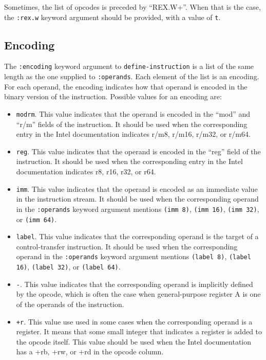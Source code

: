 Sometimes, the list of opcodes is preceded by ``REX.W+''.  When that
is the case, the \texttt{:rex.w} keyword argument should be provided,
with a value of \texttt{t}.

\subsection{Encoding}

The \texttt{:encoding} keyword argument to \texttt{define-instruction}
is a list of the same length as the one supplied to
\texttt{:operands}.  Each element of the list is an encoding.  For
each operand, the encoding indicates how that operand is encoded in
the binary version of the instruction.  Possible values for an
encoding are:

\begin{itemize}
\item \texttt{modrm}.  This value indicates that the operand is encoded in the
  ``mod'' and ``r/m'' fields of the instruction.  It should be used
  when the corresponding entry in the Intel documentation indicates
  r/m8, r/m16, r/m32, or r/m64.
\item \texttt{reg}.  This value indicates that the operand is encoded
  in the ``reg'' field of the instruction.  It should be used when the
  corresponding entry in the Intel documentation indicates r8, r16,
  r32, or r64.
\item \texttt{imm}.  This value indicates that the operand is encoded
  as an immediate value in the instruction stream.  It should be used
  when the corresponding operand in the \texttt{:operands} keyword
  argument mentions \texttt{(imm 8)}, \texttt{(imm 16)}, \texttt{(imm
    32)}, or \texttt{(imm 64)}.
\item \texttt{label}.  This value indicates that the corresponding
  operand is the target of a control-transfer instruction.  It should
  be used when the corresponding operand in the \texttt{:operands}
  keyword argument mentions \texttt{(label 8)}, \texttt{(label 16)},
  \texttt{(label 32)}, or \texttt{(label 64)}.
\item \texttt{-}.  This value indicates that the corresponding operand
  is implicitly defined by the opcode, which is often the case when
  general-purpose register A is one of the operands of the
  instruction.
\item \texttt{+r}.  This value use used in some cases when the
  corresponding operand is a register.  It means that some small
  integer that indicates a register is added to the opcode itself.
  This value should be used when the Intel documentation has a +rb,
  +rw, or +rd in the opcode column.
\end{itemize}
